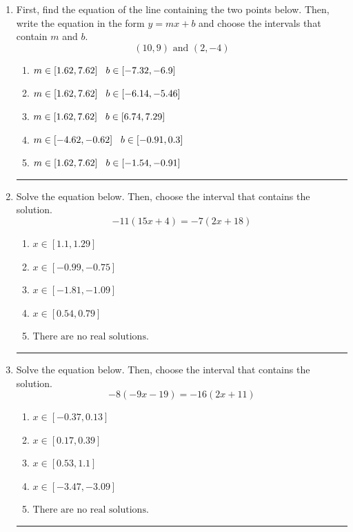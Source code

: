 \documentclass[14pt]{extbook}
\newcommand{\litem}[1]{\item#1\hspace*{-1cm}\rule{\textwidth}{0.4pt}}
\begin{document}
\begin{enumerate}
\litem{
First, find the equation of the line containing the two points below. Then, write the equation in the form $ y=mx+b $ and choose the intervals that contain $m$ and $b$.\[ (10, 9) \text{ and } (2, -4) \]\begin{enumerate}[label=\Alph*.]
\item \( m \in [1.62, 7.62] \hspace*{3mm} b \in [-7.32, -6.9] \)
\item \( m \in [1.62, 7.62] \hspace*{3mm} b \in [-6.14, -5.46] \)
\item \( m \in [1.62, 7.62] \hspace*{3mm} b \in [6.74, 7.29] \)
\item \( m \in [-4.62, -0.62] \hspace*{3mm} b \in [-0.91, 0.3] \)
\item \( m \in [1.62, 7.62] \hspace*{3mm} b \in [-1.54, -0.91] \)

\end{enumerate} }
\litem{
Solve the equation below. Then, choose the interval that contains the solution.\[ -11(15x + 4) = -7(2x + 18) \]\begin{enumerate}[label=\Alph*.]
\item \( x \in [1.1, 1.29] \)
\item \( x \in [-0.99, -0.75] \)
\item \( x \in [-1.81, -1.09] \)
\item \( x \in [0.54, 0.79] \)
\item \( \text{There are no real solutions.} \)

\end{enumerate} }
\litem{
Solve the equation below. Then, choose the interval that contains the solution.\[ -8(-9x -19) = -16(2x + 11) \]\begin{enumerate}[label=\Alph*.]
\item \( x \in [-0.37, 0.13] \)
\item \( x \in [0.17, 0.39] \)
\item \( x \in [0.53, 1.1] \)
\item \( x \in [-3.47, -3.09] \)
\item \( \text{There are no real solutions.} \)


\end{enumerate}}
\end{enumerate}
\end{document}
